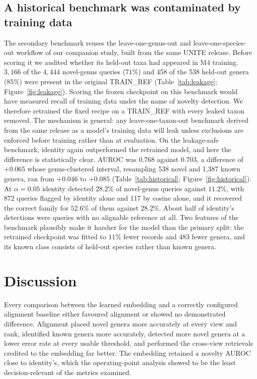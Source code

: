 \documentclass[11pt]{article}
\begin{document}


\subsection{A historical benchmark was contaminated by training data}
The secondary benchmark reuses the leave-one-genus-out and
leave-one-species-out workflow of our companion study, built from the same
UNITE release. Before scoring it we audited whether its held-out taxa had
appeared in M4 training. $3{,}166$ of the $4{,}444$ novel-genus queries ($71\%$)
and 458 of the 538 held-out genera ($85\%$) were present in the original
TRAIN\_REF (Table~\ref{tab:leakage}; Figure~\ref{fig:leakage}). Scoring the
frozen checkpoint on this benchmark would have measured recall of training data
under the name of novelty detection. We therefore retrained the fixed recipe on
a TRAIN\_REF with every leaked taxon removed. The mechanism is general: any
leave-one-taxon-out benchmark derived from the same release as a model's
training data will leak unless exclusions are enforced before training rather
than at evaluation. On the leakage-safe benchmark, identity again outperformed the retrained model,
and here the difference is statistically clear. AUROC was $0.768$ against
$0.703$, a difference of $+0.065$ whose genus-clustered interval, resampling 538
novel and 1,387 known genera, ran from $+0.046$ to $+0.085$
(Table~\ref{tab:historical}; Figure~\ref{fig:historical}). At $\alpha=0.05$
identity detected $28.2\%$ of novel-genus queries against $11.2\%$, with 872
queries flagged by identity alone and 117 by cosine alone, and it recovered the
correct family for $52.6\%$ of them against $28.2\%$. About half of identity's
detections were queries with no alignable reference at all. Two features of the
benchmark plausibly make it harsher for the model than the primary split: the
retrained checkpoint was fitted to $11\%$ fewer records and 483 fewer genera,
and its known class consists of held-out species rather than known genera.
\section{Discussion}
Every comparison between the learned embedding and a correctly configured
alignment baseline either favoured alignment or showed no demonstrated
difference. Alignment placed novel genera more accurately at every view and
rank, identified known genera more accurately, detected more novel genera at a
lower error rate at every usable threshold, and performed the cross-view
retrievals credited to the embedding far better. The embedding retained a novelty
AUROC close to identity's, which the operating-point analysis showed to be the
least decision-relevant of the metrics examined.
\end{document}
